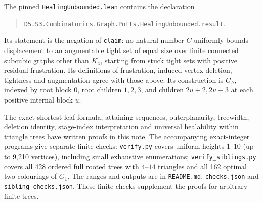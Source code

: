 \documentclass[11pt]{article}
\begin{document}
The pinned
\href{https://github.com/the-omega-institute/trureturing/blob/0ad94071772b2f32b432905d088bfce029d8d29e/D5/S3/Combinatorics/Graph/Potts/HealingUnbounded.lean}{\texttt{HealingUnbounded.lean}}
contains the declaration
\begin{quote}\small
\nolinkurl{D5.S3.Combinatorics.Graph.Potts.HealingUnbounded.result}.
\end{quote}
Its statement is the negation of \texttt{claim}: no natural number $C$
uniformly bounds displacement to an augmentable tight set of equal size
over finite connected subcubic graphs other than $K_4$, starting from
stuck tight sets with positive residual frustration. Its definitions
of frustration, induced vertex deletion, tightness and augmentation
agree with those above. Its construction is $G_h$, indexed by root
block $0$, root children $1,2,3$, and children $2u+2,2u+3$ at each
positive internal block $u$.

The exact shortest-leaf formula, attaining sequences, outerplanarity,
treewidth, deletion identity, stage-index interpretation and universal
healability within triangle trees have written proofs in this note.
The accompanying exact-integer programs give separate finite checks:
\texttt{verify.py} covers uniform heights $1$--$10$ (up to 9,210
vertices), including small exhaustive enumerations;
\texttt{verify\_siblings.py} covers all 428 ordered full rooted trees
with $4$--$14$ triangles and all 162 optimal two-colourings of $G_1$.
The ranges and outputs are in \texttt{README.md}, \texttt{checks.json}
and \texttt{sibling-checks.json}. These finite checks supplement the
proofs for arbitrary finite trees.
\end{document}

